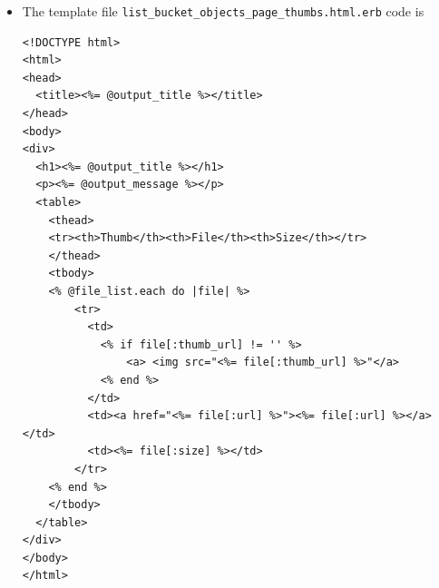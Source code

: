 \documentclass{beamer}
\begin{document}
\begin{frame}
\begin{itemize}
\begin{lstlisting}[escapechar=!]
def get_file_list( s3, cloud_front, bucket_name, thumb_bucket_name )
  distribution = find_distribution_for_bucket cloud_front, bucket_name
  url = distribution ?  "https://#{distribution[:domain_name]}" : "#{S3_AMAZONAWS_URL}/#{bucket_name}"

  thumb_distribution = find_distribution_for_bucket cloud_front, thumb_bucket_name
  thumb_url = if thumb_distribution then
                 "https://#{thumb_distribution[:domain_name]}"
               else
                 "#{S3_AMAZONAWS_URL}/#{thumb_bucket_name}"
               end
  
  # access to objects in the buckets
  objects = get_bucket_objects s3, bucket_name
  thumb_objects = get_bucket_objects s3, thumb_bucket_name

  file_list = []
  objects.each do |object|
    key = object[:key]
    thumb_uri = thumb_objects.detect{|thumb_object| thumb_object[:key] == key}?  "#{thumb_url}/#{key}": ''

    file_list << { key: key, size: object[:size], url: "#{url}/#{key}", thumb_url: thumb_uri}
    return file_list if file_list.size > 10
  end
  file_list
end

if __FILE__ == $0
  unless ARGV.size == 2
    puts "Usage: #{__FILE__} <BUCKET_NAME|-> <THUMB_BUCKET_NAME|->"
    exit 1
  end

  (bucket_name, thumb_bucket_name) = ARGV
  bucket_name = BOOK_BUCKET if bucket_name == '-'
  thumb_bucket_name = "#{BOOK_BUCKET}#{THUMB_BUCKET_SUFFIX}" if thumb_bucket_name == '-'

  # get an instance of the S3 interface using the default configuration
  s3 = AWS::S3.new

  # get an instance of the CloudFront interface using the default configuration
  cloud_front = AWS::CloudFront.new

  puts get_file_list( s3, cloud_front, bucket_name, thumb_bucket_name ).to_s
end
\end{lstlisting}

\item The template file \texttt{list\_bucket\_objects\_page\_thumbs.html.erb} code is
\lstset{language=Ruby, style=eclipse}
\begin{lstlisting}
<!DOCTYPE html>
<html>
<head>
  <title><%= @output_title %></title>
</head>
<body>
<div>
  <h1><%= @output_title %></h1>
  <p><%= @output_message %></p>
  <table>
    <thead>
    <tr><th>Thumb</th><th>File</th><th>Size</th></tr>
    </thead>
    <tbody>
    <% @file_list.each do |file| %>
        <tr>
          <td>
            <% if file[:thumb_url] != '' %>
                <a> <img src="<%= file[:thumb_url] %>"</a>
            <% end %>
          </td>
          <td><a href="<%= file[:url] %>"><%= file[:url] %></a></td>
          <td><%= file[:size] %></td>
        </tr>
    <% end %>
    </tbody>
  </table>
</div>
</body>
</html>
\end{lstlisting}


\end{itemize}
\end{frame}
\end{document}
